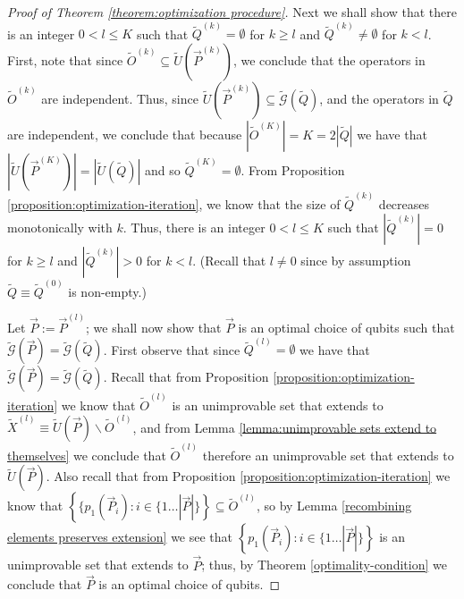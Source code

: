 \documentclass[twocolumn,showpacs,preprintnumbers,amsmath,amssymb,nofootinbib,pra,floatfix]{revtex4-1}
\newcommand{\lst}{\vec}
\newcommand{\set}{\tilde}
\newcommand{\genfun}{\tilde{\mathcal{G}}}
\begin{document}
\begin{proof}[Proof of Theorem \ref{theorem:optimization procedure}]
Next we shall show that there is an integer $0 < l \le K$ such that $\set Q^{(k)}=\emptyset$ for $k\ge l$ and $\set Q^{(k)}\ne\emptyset$ for $k < l$.  First, note that since $\set O^{(k)}\subseteq \set U(\lst P^{(k)})$, we conclude that the operators in $\set O^{(k)}$ are independent.  Thus, since $\set U(\lst P^{(k)}) \subseteq \genfun(\set Q)$, and the operators in $\set Q$ are independent, we conclude that because $|\set O^{(K)}|=K=2|\set Q|$ we have that $|\set U(\lst P^{(K)})|=|\set U(\set Q)|$ and so $\set Q^{(K)}=\emptyset$.  From Proposition \ref{proposition:optimization-iteration}, we know that the size of $\set Q^{(k)}$ decreases monotonically with $k$.  Thus, there is an integer $0 < l \le K$ such that $|\set Q^{(k)}|=0$ for $k\ge l$ and $|\set Q^{(k)}|>0$ for $k < l$.  (Recall that $l\ne 0$ since by assumption $\set Q\equiv \set Q^{(0)}$ is non-empty.)

Let $\lst P:=\lst P^{(l)}$;  we shall now show that $\lst P$ is an optimal choice of qubits such that $\genfun(\lst P)=\genfun(\set Q)$.  First observe that since $\set Q^{(l)}=\emptyset$ we have that $\genfun(\lst P)=\genfun(\set Q)$.  Recall that from Proposition \ref{proposition:optimization-iteration} we know that $\set O^{(l)}$ is an unimprovable set that extends to $\set X^{(l)}\equiv \set U(\lst P)\backslash\set O^{(l)}$, and from Lemma \ref{lemma:unimprovable sets extend to themselves} we conclude that $\set O^{(l)}$ therefore an unimprovable set that extends to $\set U(\lst P)$.  Also recall that from Proposition \ref{proposition:optimization-iteration} we know that $\left\{\{p_1(\lst P_i):i\in\{1\dots |\lst P|\}\right\}\subseteq \set O^{(l)}$, so by Lemma \ref{recombining elements preserves extension} we see that $\left\{p_1(\lst P_i):i\in\{1\dots |\lst P|\}\right\}$ is an unimprovable set that extends to $\lst P$; thus, by Theorem \ref{optimality-condition} we conclude that $\lst P$ is an optimal choice of qubits.


\end{proof}
\end{document}
